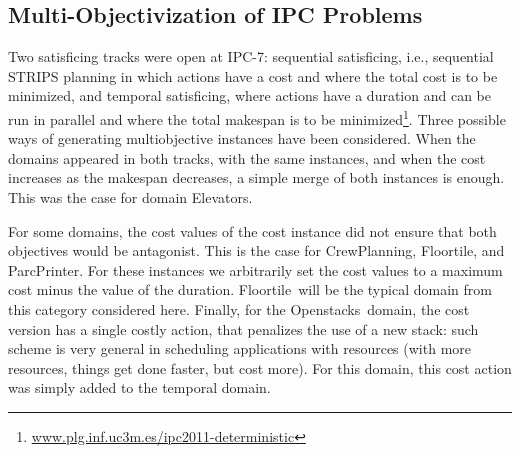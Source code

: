 \documentclass{article}
\newcommand{\OPENSTACKS}{{\sc Openstacks}}
\newcommand{\ELEVATORS}{{\sc Elevators}}
\newcommand{\CREWPLANNING}{{\sc CrewPlanning}}
\newcommand{\FLOORTILE}{{\sc Floortile}}
\newcommand{\PARCPRINTER}{{\sc ParcPrinter}}
\begin{document}
\subsection{Multi-Objectivization of IPC Problems}
\label{IPCbenchmarks}
Two satisficing tracks were open at IPC-7: sequential satisficing, i.e., sequential STRIPS planning in which actions have a cost and where the total cost is to be minimized, and temporal satisficing, where actions have a duration and can be run in parallel and where the total makespan is to be minimized\footnote{\url{www.plg.inf.uc3m.es/ipc2011-deterministic}}.
Three possible ways of generating multiobjective instances have been considered. When the domains appeared in both tracks, with the same instances, and when the cost increases as the makespan decreases, a simple merge of both instances is enough. This was the case for domain \ELEVATORS.



For some domains, the cost values of the cost instance did not ensure that both objectives would be antagonist. This is the case for \CREWPLANNING, \FLOORTILE, and \PARCPRINTER. For these instances we arbitrarily set the cost values to a maximum cost minus the value of the duration. \FLOORTILE\ will be the typical domain from this category considered here.
Finally, for the \OPENSTACKS\ domain, the cost version has a single costly action, that penalizes the use of a new stack: such scheme is very general in scheduling applications with resources (with more resources, things get done faster, but cost more). For this domain, this cost action was simply added to the temporal domain.
\end{document}
